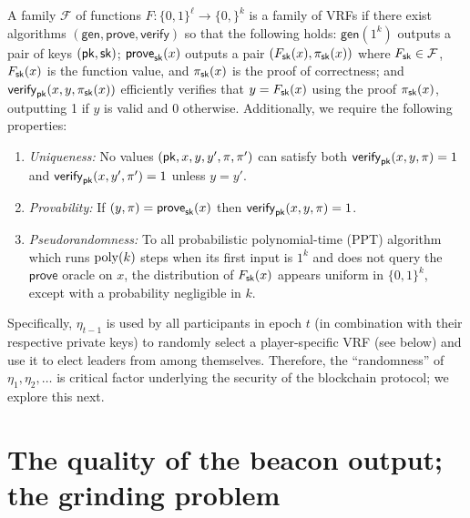 \newcommand{\Gen}{\mathsf{gen}}
\newcommand{\Prove}{\mathsf{prove}}
\newcommand{\Verify}{\mathsf{verify}}
\begin{definition}\label{def:VRF}
  A family $\mathcal{F}$ 
  of functions $F : \{0,1\}^\ell \rightarrow \{0,\}^k$ 
  is a family of VRFs if there exist algorithms 
  $(\Gen, \Prove, \Verify)$ 
  so that the following holds: 
  $\Gen(1^k)$ outputs a pair of keys $(\mathsf{pk}, \mathsf{sk})$; 
  $\Prove_\sk(x)$ outputs a pair $(F_{\mathsf{sk}}(x), \pi_{\mathsf{sk}}(x))$ 
  where 
  $F_{\mathsf{sk}} \in \mathcal{F}$, $F_{\mathsf{sk}}(x)$ is the function value, and 
  $\pi_{\mathsf{sk}}(x)$ is the proof of correctness; and 
  $\Verify_\pk(x,y,\pi_\sk(x))$ efficiently verifies 
  that $y = F_{\mathsf{sk}}(x)$ using the proof $\pi_{\mathsf{sk}}(x)$, 
  outputting 1 if $y$ is valid and 0 otherwise. 
  Additionally, we require the following properties:

  \begin{enumerate}
    \item \emph{Uniqueness:} 
    No values $(\mathsf{pk}, x, y, y', \pi, \pi')$  can satisfy both 
    $\Verify_\pk(x,y,\pi) = 1$ and $\Verify_\pk(x,y',\pi') = 1$ 
    unless $y = y'$.

    \item \emph{Provability:} 
    If $(y, \pi) = \Prove_\sk(x)$ then $\Verify_\pk(x,y, \pi) = 1$.

    \item \emph{Pseudorandomness:} 
    To all probabilistic polynomial-time (PPT) algorithm 
    which runs $\mathrm{poly}(k)$ steps when its first input is $1^k$ 
    and does not query the $\Prove$ oracle on $x$, 
    the distribution of $F_{\mathsf{sk}}(x)$ appears uniform in $\{0,1\}^k$, 
    except with a probability negligible in $k$.
  \end{enumerate}

\end{definition}

Specifically, $\eta_{t-1}$ is used by all participants in epoch $t$ 
(in combination with their respective private keys) 
to randomly select a player-specific VRF (see below) 
and use it to elect leaders from among themselves.
Therefore, the ``randomness''
of $\eta_1, \eta_2, \ldots$ is critical factor underlying 
the security of the blockchain protocol; 
we explore this next.

\section{The quality of the beacon output; the grinding problem}

